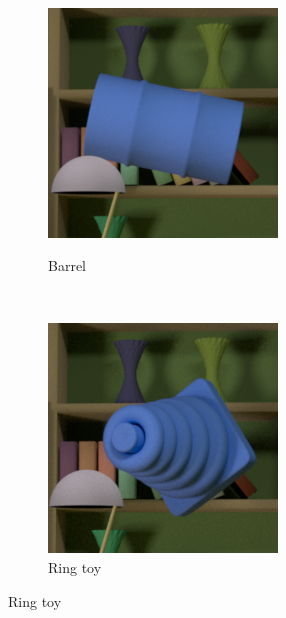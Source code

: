 \documentclass{jov}
\begin{document}
\begin{figure}
\begin{subfigure}[b]{0.14 \textwidth}
        \label{fig:libraryWithXylophone}
    \end{subfigure}
     ~ 
    \begin{subfigure}[b]{0.14 \textwidth}
        \caption{Barrel}
        \includegraphics[width=\textwidth]{../FiguresDraft4/Figure4/Figure4_c.png}
        \label{fig:libraryWithBarrel}
         \end{subfigure}
    ~
	\begin{subfigure}[b]{0.14 \textwidth}
        \caption{Ring toy}
        \includegraphics[width=\textwidth]{../FiguresDraft4/Figure4/Figure4_d.png}

\end{subfigure}
\end{figure}
\end{document}
